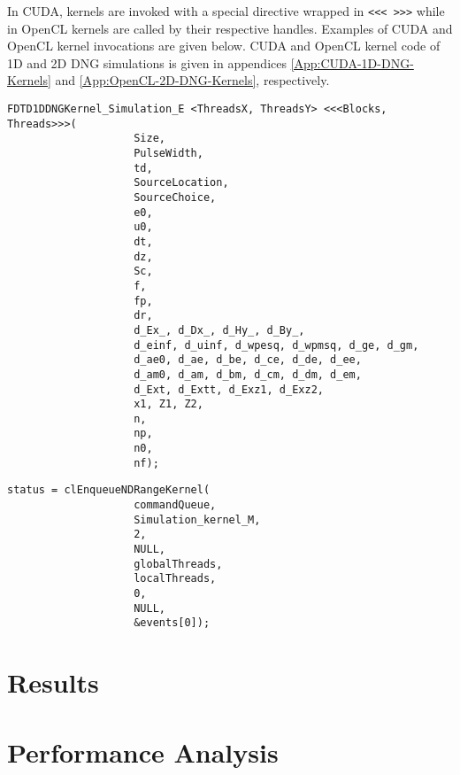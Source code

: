 In CUDA, kernels are invoked with a special directive wrapped in \verb|<<< >>>| while in OpenCL kernels are called by their respective handles. Examples of CUDA and OpenCL kernel invocations are given below. CUDA and OpenCL kernel code of 1D and 2D DNG simulations is given in appendices \ref{App:CUDA-1D-DNG-Kernels} and \ref{App:OpenCL-2D-DNG-Kernels}, respectively.
\label{lst:CUDA-Kernel-Call}
\begin{lstlisting}[caption={CUDA Kernel Call}]
FDTD1DDNGKernel_Simulation_E <ThreadsX, ThreadsY> <<<Blocks, Threads>>>(
					Size,
					PulseWidth,
					td,
					SourceLocation,
					SourceChoice,
					e0,
					u0,
					dt,
					dz,
					Sc,
					f,
					fp,
					dr,
					d_Ex_, d_Dx_, d_Hy_, d_By_,
					d_einf, d_uinf, d_wpesq, d_wpmsq, d_ge, d_gm,
					d_ae0, d_ae, d_be, d_ce, d_de, d_ee,
					d_am0, d_am, d_bm, d_cm, d_dm, d_em,
					d_Ext, d_Extt, d_Exz1, d_Exz2,
					x1, Z1, Z2,
					n,
					np,
					n0,
					nf);
\end{lstlisting}
\label{lst:OpenCL-Kernel-Call}
\begin{lstlisting}[caption={OpenCL Kernel Call}]
status = clEnqueueNDRangeKernel(
					commandQueue,
					Simulation_kernel_M,
					2,
					NULL,
					globalThreads,
					localThreads,
					0,
					NULL,
					&events[0]);
\end{lstlisting}
\section{Results}

\section{Performance Analysis}
